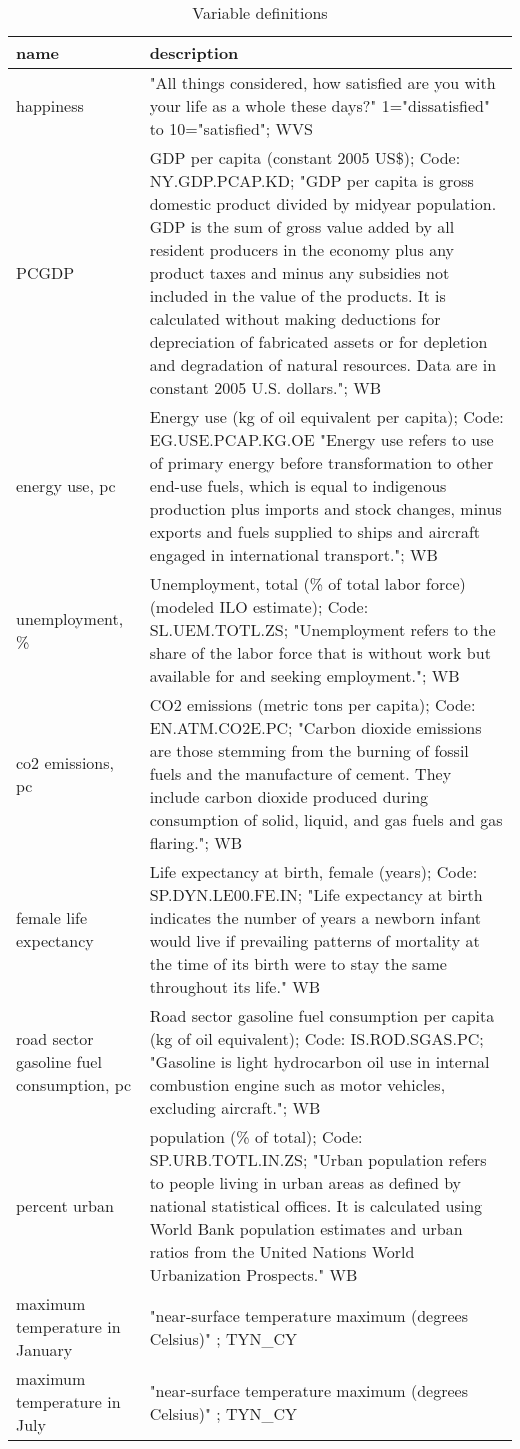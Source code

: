 \begin{table}[H]\centering\footnotesize
 \caption{\label{var_des} Variable definitions}
\begin{tabular} {p{1.5in}p{4.5in}}   \hline
name & description   \\ \hline
  happiness & "All things considered, how satisfied are you with your life as a whole these days?" 1="dissatisfied" to 10="satisfied"; WVS \\
  PCGDP & GDP per capita (constant 2005 US\$); Code: NY.GDP.PCAP.KD; "GDP per capita is gross domestic product divided by midyear population. GDP is the sum of gross value added by all resident producers in the economy plus any product taxes and minus any subsidies not included in the value of the products. It is calculated without making deductions for depreciation of fabricated assets or for depletion and degradation of natural resources. Data are in constant 2005 U.S. dollars."; WB \\
  energy use, pc & Energy use (kg of oil equivalent per capita); Code: EG.USE.PCAP.KG.OE "Energy use refers to use of primary energy before transformation to other end-use fuels, which is equal to indigenous production plus imports and stock changes, minus exports and fuels supplied to ships and aircraft engaged in international transport."; WB \\
  unemployment, \% & Unemployment, total (\% of total labor force) (modeled ILO estimate); Code: SL.UEM.TOTL.ZS; "Unemployment refers to the share of the labor force that is without work but available for and seeking employment."; WB \\
  co2 emissions, pc & CO2 emissions (metric tons per capita); Code: EN.ATM.CO2E.PC; "Carbon dioxide emissions are those stemming from the burning of fossil fuels and the manufacture of cement. They include carbon dioxide produced during consumption of solid, liquid, and gas fuels and gas flaring."; WB \\
  female life expectancy & Life expectancy at birth, female (years); Code: SP.DYN.LE00.FE.IN; "Life expectancy at birth indicates the number of years a newborn infant would live if prevailing patterns of mortality at the time of its birth were to stay the same throughout its life." WB\\
  road sector gasoline fuel consumption, pc & Road sector gasoline fuel consumption per capita (kg of oil equivalent); Code: IS.ROD.SGAS.PC; "Gasoline is light hydrocarbon oil use in internal combustion engine such as motor vehicles, excluding aircraft."; WB \\
  percent urban & population (\% of total); Code: SP.URB.TOTL.IN.ZS; "Urban population refers to people living in urban areas as defined by national statistical offices. It is calculated using World Bank population estimates and urban ratios from the United Nations World Urbanization Prospects." WB\\
  maximum temperature in January & "near-surface temperature maximum (degrees Celsius)" ; TYN\_CY \\
  maximum temperature in July & "near-surface temperature maximum (degrees Celsius)" ; TYN\_CY \\
\hline\end{tabular}\end{table}
